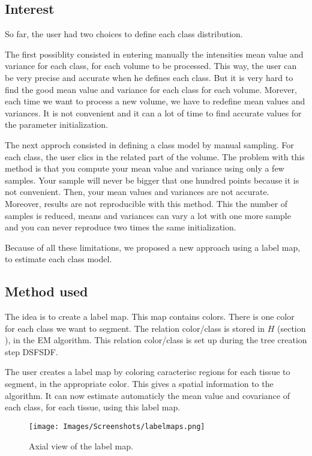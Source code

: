 \subsection{Interest}
%
So far, the user had two choices to define each class distribution. 
\par
The first possiblity consisted in entering manually the intensities mean value and variance for each class, for each volume to be processed. This way, the user can be very precise and accurate when he defines each class. But it is very hard to find the good mean value and variance for each class for each volume. Morever, each time we want to process a new volume, we have to redefine mean values and variances. It is not convenient and it can a lot of time to find accurate values for the parameter initialization. 
\par
The next approch consisted in defining a class model by manual sampling. For each class, the user clics in the related part of the volume. The problem with this method is that you compute your mean value and variance using only a few samples. Your sample will never be bigger that one hundred points because it is not convenient. Then, your mean values and variances are not accurate. Moreover, results are not reproducible with this method. This the number of samples is reduced, means and variances can vary a lot with one more sample and you can never reproduce two times the same initialization.
\par
Because of all these limitations,  we proposed a new approach using a label map, to estimate each class model.
%
\subsection{Method used}
%
The idea is to create a label map. This map contains colors. There is one color for each class we want to segment. The relation color/class is stored in $H$ (section ), in the EM algorithm. This relation color/class is set up during the tree creation step DSFSDF.
\par
The user creates a label map by coloring caracterisc regions for each tissue to segment, in the appropriate color. This gives a spatial information to the algorithm. It can now estimate automaticly the mean value and covariance of each class, for each tissue, using this label map.

\begin{figure}\centering
  \texttt{[image: Images/Screenshots/labelmaps.png]}
  \caption{Axial view of the label map.}\label{fig:labelmaps}
\end{figure}

